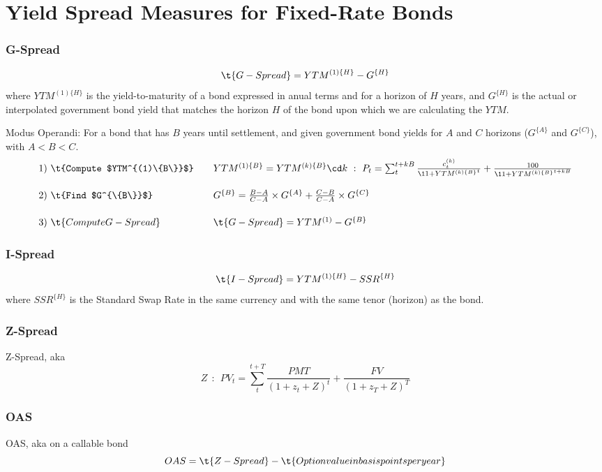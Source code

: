 \documentclass[12pt,article]{memoir}
\begin{document}
\section{Yield Spread Measures for Fixed-Rate Bonds}
\subsubsection{G-Spread}

$$
\t{G-Spread} = YTM^{(1)\{H\}}-G^{\{H\}}
$$
where $YTM^{(1)\{H\}}$ is the yield-to-maturity of a bond expressed in anual terms and for a horizon of $H$ years, and $G^{\{H\}}$ is the actual or interpolated government bond yield that matches the horizon $H$ of the bond upon which we are calculating the $YTM$. 

Modus Operandi: For a bond that has $B$ years until settlement, and given government bond yields for $A$ and $C$ horizons ($G^{\{A\}}$ and $G^{\{C\}}$), with $A<B<C$.
$$\begin{array}{lllll}
1)~\t{Compute  $YTM^{(1)\{B\}}$} && YTM^{(1)\{B\}}=YTM^{(k)\{B\}}\cd k~:~P_t = \sum_{t}^{t+kB} \frac{c_t^{(k)}}{\1{1+YTM^{(k)\{B\}}}^t} + \frac{100}{\1{1+YTM^{(k)\{B\}}}^{t+kB}}
\\[1.5em]
2)~\t{Find $G^{\{B\}}$} && G^{\{B\}}= \frac{B-A}{C-A} \times G^{\{A\}} +  \frac{C-B}{C-A} \times G^{\{C\}}
\\[1.5em]
3)~\t{Compute G-Spread} && \t{G-Spread} = YTM^{(1)} - G^{\{B\}}
\end{array}$$

\subsubsection{I-Spread}
$$
\t{I-Spread} = YTM^{(1)\{H\}} - SSR^{\{H\}}
$$
where $SSR^{\{H\}}$ is the Standard Swap Rate in the same currency and with the same tenor (horizon) as the bond.

\subsubsection{Z-Spread}
Z-Spread, aka 
$$
Z~~:~~ PV_t = \sum_{t}^{t+T} \frac{PMT}{(1+z_t+Z)^t} + \frac{FV}{(1+z_T+Z)^T}
$$

\subsubsection{OAS}
OAS, aka  on a callable bond
$$
OAS = \t{Z-Spread}-\t{Option value in basis points per year}
$$
\end{document}

